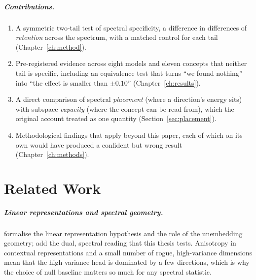 \documentclass[11pt]{report}
\begin{document}
\paragraph{Contributions.}
\begin{enumerate}
  \item A symmetric two-tail test of spectral specificity, a difference in
        differences of \emph{retention} across the spectrum, with a matched
        control for each tail (Chapter~\ref{ch:method}).
  \item Pre-registered evidence across eight models and eleven concepts that
        neither tail is specific, including an equivalence test that turns ``we
        found nothing'' into ``the effect is smaller than $\pm0.10$''
        (Chapter~\ref{ch:results}).
  \item A direct comparison of spectral \emph{placement} (where a direction's
        energy sits) with subspace \emph{capacity} (where the concept can be
        read from), which the original account treated as one quantity
        (Section~\ref{sec:placement}).
  \item Methodological findings that apply beyond this paper, each of which on
        its own would have produced a confident but wrong result
        (Chapter~\ref{ch:methods}).
\end{enumerate}

\chapter{Related Work}

\paragraph{Linear representations and spectral geometry.}
\citet{park2024linear} formalise the linear representation hypothesis and the
role of the unembedding geometry; \citet{acharya2026concepts} add the dual,
spectral reading that this thesis tests. Anisotropy in contextual
representations \citep{ethayarajh2019contextual} and a small number of rogue,
high-variance dimensions \citep{timkey2021all} mean that the high-variance head
is dominated by a few directions, which is why the choice of null baseline
matters so much for any spectral statistic.
\end{document}

